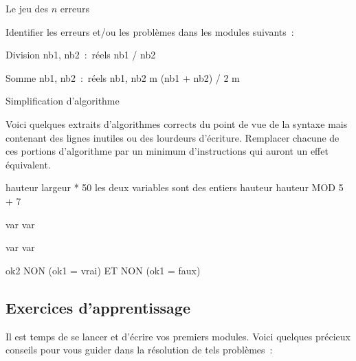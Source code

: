\begin{Exercice}{Le jeu des $n$ erreurs}

	Identifier les erreurs et/ou les
	problèmes dans les modules suivants~:

	\begin{Pseudocode}
	 \Comment Division
		\Decl nb1, nb2~:~réels
		\Write nb1 / nb2
	\EndModule
	\end{Pseudocode}

	\begin{Pseudocode}
	 \Comment Somme
		\Decl nb1, nb2~:~réels
		\Read nb1, nb2
		\Let m \Gets (nb1 + nb2) / 2
		\Write m
	\EndModule
	\end{Pseudocode}


\end{Exercice}

\begin{Exercice}{Simplification d’algorithme}

	Voici quelques extraits d’algorithmes corrects du point de vue de la
	syntaxe mais contenant des lignes inutiles ou des lourdeurs d’écriture.
	Remplacer chacune de ces portions d’algorithme par un minimum
	d’instructions qui auront un effet équivalent.

	\begin{Pseudocode}
	\Let hauteur \Gets largeur * 50 \Comment les deux variables sont des entiers
	\Let hauteur \Gets hauteur MOD 5 + 7
	\end{Pseudocode}

	\begin{Pseudocode}
	\Read var
	\Let var \Gets 0
	\end{Pseudocode}

	\begin{Pseudocode}
	\Let var 
	\Read var
	\end{Pseudocode}

	\begin{Pseudocode}
	\Let ok2 \Gets NON (ok1 = vrai) ET NON (ok1 = faux)
	\end{Pseudocode}

\end{Exercice}

\subsection{Exercices d’apprentissage}

	Il est temps de se lancer et d’écrire vos premiers
	modules. Voici quelques précieux conseils pour vous 
	guider dans la résolution de tels problèmes~:

